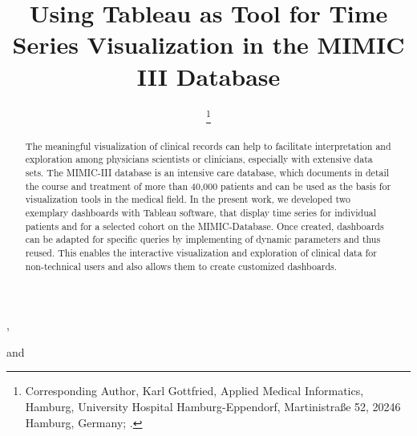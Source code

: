 \documentclass[aac,crcready]{iosart2x}
\begin{document}
\begin{frontmatter}

{\centering \title{Using Tableau as Tool for Time Series Visualization in the MIMIC III Database 
}}


\author[A]{ %
\thanks{Corresponding Author, Karl Gottfried, Applied Medical Informatics, Hamburg, University Hospital Hamburg-Eppendorf, Martinistraße 52, 20246 Hamburg, Germany;  .}},
\author[A]{ }
and
\author[A]{ }
\address[A]{Applied Medical Informatics, , Germany, ,
}
\address[B]{Department first, ,
Abbreviate US states, }


\begin{abstract}
The meaningful visualization of clinical records can help to facilitate interpretation and exploration among physicians scientists or clinicians, especially with extensive data sets. The MIMIC-III database is an intensive care database, which documents in detail the course and treatment of more than 40,000 patients and can be used as the basis for visualization tools in the medical field. In the present work, we developed two exemplary dashboards with Tableau software, that display time series for individual patients and for a selected cohort on the MIMIC-Database. Once created, dashboards can be adapted for specific queries by implementing of dynamic parameters and thus reused. This enables the interactive visualization and exploration of clinical data for non-technical users and also allows them to create customized dashboards.
\end{abstract}

\begin{keyword}
\end{keyword}

\end{frontmatter}
\end{document}
